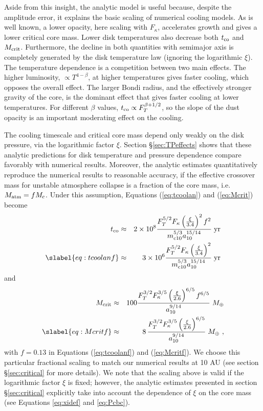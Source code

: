 \documentclass[apj, numberedappendix]{emulateapj}
\newcommand{\yr}{\; {\rm yr}}
\newcommand{\co}{_{\rm c}}
\newcommand{\mcn}[1] { m_{ \rm c #1} }
\newcommand{\MC}{M_{\rm crit}}
\newcommand{\aun}[1]{ a_{#1} }
\begin{document}
Aside from this insight, the analytic model is useful because, despite the amplitude error, it explains the basic scaling of numerical cooling models.  As is well known, a lower opacity, here scaling with $F_\kappa$, accelerates growth and gives a lower critical core mass. Lower disk temperatures also decrease both $t_{\rm co}$ and $\MC$.  Furthermore, the decline in both quantities with semimajor axis is completely generated by the disk temperature law (ignoring the logarithmic $\xi$).  The temperature dependence is a competition between two main effects.  The higher luminosity, $\propto T^{4-\beta}$, at higher temperatures gives faster cooling, which opposes the overall effect.  The larger Bondi radius, and the effectively stronger gravity of the core, is the dominant effect that gives faster cooling at lower temperatures.  For different $\beta$ values, $t_{\rm co} \propto F_T^{ \beta + 1/2}$, so the slope of the dust opacity is an important moderating effect on the cooling.

The cooling timescale and critical core mass depend only weakly on the disk pressure, via the  logarithmic factor $\xi$.  Section \S\ref{sec:TPeffects} shows that these analytic predictions for disk temperature and pressure dependence compare favorably with numerical results. Moreover, the analytic estimates quantitatively reproduce the numerical results to reasonable accuracy, if the effective crossover mass for unstable atmosphere collapse is a fraction of the core mass, i.e. $M_{\rm atm}=f M\co$. Under this assumption, Equations (\ref{eq:tcoolan}) and (\ref{eq:Mcrit}) become
\begin{eqnarray} 
\label{eq:tcoolanscaled}
t_{\rm co} &\approx & 2 \times 10^8 {F_T^{5/2}  F_\kappa \left(\xi \over 3.4\right)^2 f^2  \over \mcn{10}^{5/3} \aun{10}^{15 / 14}} \yr \\ \slabel{eq:tcoolanf}
 & \approx & 3 \times 10^6 {F_T^{5/2}  F_\kappa \left(\xi \over 3.4\right)^2  \over \mcn{10}^{5/3} \aun{10}^{15 / 14}} \yr
\end{eqnarray} 
and
\begin{eqnarray}\label{eq:Mcritscaled}
\MC &\approx & 100 {F_T^{3/2} F_\kappa^{3/5}   \left(\xi \over 2.6 \right)^{6/5} f^{6/5} \over \aun{10}^{9 / 14}} \; M_\oplus \\ \slabel{eq:Mcritf}
& \approx & 8\, {F_T^{3/2} F_\kappa^{3/5}   \left(\xi \over 2.6 \right)^{6/5} \over \aun{10}^{9 / 14}} \; M_\oplus\ ,
\end{eqnarray}
with $f=0.13$ in Equations (\ref{eq:tcoolanf}) and (\ref{eq:Mcritf}). We choose this particular fractional scaling to match our numerical results at 10 AU (see section \S\ref{sec:critical} for more details). We note that the scaling above is valid if the logarithmic factor $\xi$ is fixed; however, the analytic estimates presented in section \S\ref{sec:critical} explicitly take into account the dependence of $\xi$ on the core mass (see Equations \ref{eq:xidef} and \ref{eq:Pcbc}).
\end{document}
